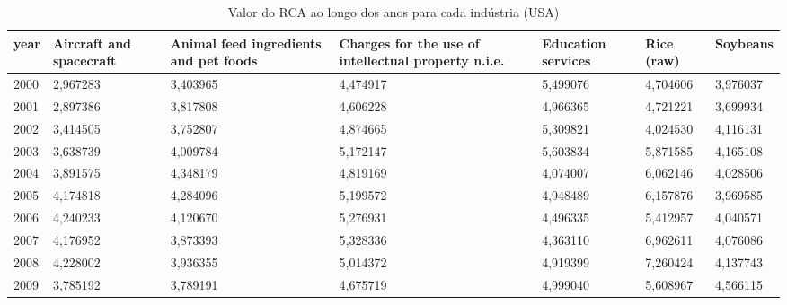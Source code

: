 \begin{table}
\centering
\caption{Valor do RCA ao longo dos anos para cada indústria (USA)}
\begin{tabular}{p{1cm}p{2cm}p{2cm}p{2cm}p{2cm}p{2cm}p{2cm}}
\toprule
 year &  Aircraft and spacecraft &  Animal feed ingredients and pet foods &  Charges for the use of intellectual property n.i.e. &  Education services &  Rice (raw) &  Soybeans \\
\midrule
 2000 &                 2,967283 &                               3,403965 &                                           4,474917 &            5,499076 &    4,704606 &  3,976037 \\
 2001 &                 2,897386 &                               3,817808 &                                           4,606228 &            4,966365 &    4,721221 &  3,699934 \\
 2002 &                 3,414505 &                               3,752807 &                                           4,874665 &            5,309821 &    4,024530 &  4,116131 \\
 2003 &                 3,638739 &                               4,009784 &                                           5,172147 &            5,603834 &    5,871585 &  4,165108 \\
 2004 &                 3,891575 &                               4,348179 &                                           4,819169 &            4,074007 &    6,062146 &  4,028506 \\
 2005 &                 4,174818 &                               4,284096 &                                           5,199572 &            4,948489 &    6,157876 &  3,969585 \\
 2006 &                 4,240233 &                               4,120670 &                                           5,276931 &            4,496335 &    5,412957 &  4,040571 \\
 2007 &                 4,176952 &                               3,873393 &                                           5,328336 &            4,363110 &    6,962611 &  4,076086 \\
 2008 &                 4,228002 &                               3,936355 &                                           5,014372 &            4,919399 &    7,260424 &  4,137743 \\
 2009 &                 3,785192 &                               3,789191 &                                           4,675719 &            4,999040 &    5,608967 &  4,566115 \\

\end{tabular}
\end{table}
